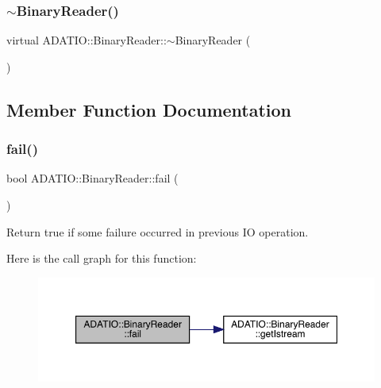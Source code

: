 \subsubsection{\texorpdfstring{$\sim$BinaryReader()}{~BinaryReader()}\hspace{0.1cm}{\footnotesize\ttfamily [2/2]}}
{\footnotesize\ttfamily virtual A\+D\+A\+T\+I\+O\+::\+Binary\+Reader\+::$\sim$\+Binary\+Reader (\begin{DoxyParamCaption}{ }\end{DoxyParamCaption})\hspace{0.3cm}{\ttfamily [virtual]}}



\subsection{Member Function Documentation}
\mbox{\label{classADATIO_1_1BinaryReader_a74e6bd6e0add2d0af3266b2c0578ae5f}} 
\subsubsection{\texorpdfstring{fail()}{fail()}\hspace{0.1cm}{\footnotesize\ttfamily [1/2]}}
{\footnotesize\ttfamily bool A\+D\+A\+T\+I\+O\+::\+Binary\+Reader\+::fail (\begin{DoxyParamCaption}{ }\end{DoxyParamCaption})\hspace{0.3cm}{\ttfamily [virtual]}}



Return true if some failure occurred in previous IO operation. 

Here is the call graph for this function\+:\nopagebreak
\begin{figure}[H]
\begin{center}
\leavevmode
\includegraphics[width=350pt]{da/dd9/classADATIO_1_1BinaryReader_a74e6bd6e0add2d0af3266b2c0578ae5f_cgraph}
\end{center}
\end{figure}
\mbox{\label{classADATIO_1_1BinaryReader_a4db0ebc0b7edd371bf0daa98e3bc696b}} 

